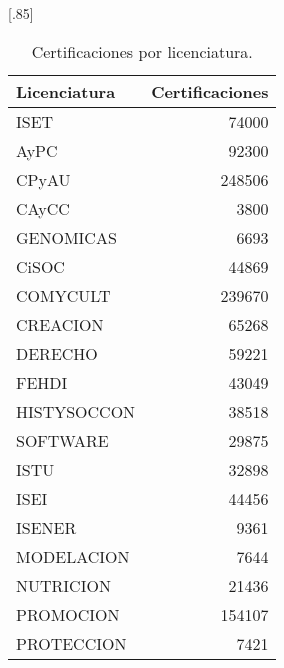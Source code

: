 \documentclass[12pt]{article}
\begin{document}
\begin{table}[ht]
\centering
\scalebox{0.75}[.85]{
\begin{tabular}{lr}
  \hline
 Licenciatura& Certificaciones \\ 
  \hline
ISET & 74000 \\ 
  AyPC & 92300 \\ 
  CPyAU & 248506 \\ 
  CAyCC & 3800 \\ 
  GENOMICAS & 6693 \\ 
  CiSOC & 44869 \\ 
  COMYCULT & 239670 \\ 
  CREACION & 65268 \\ 
  DERECHO & 59221 \\ 
  FEHDI & 43049 \\ 
  HISTYSOCCON & 38518 \\ 
  SOFTWARE & 29875 \\ 
  ISTU & 32898 \\ 
  ISEI & 44456 \\ 
  ISENER & 9361 \\ 
  MODELACION & 7644 \\ 
  NUTRICION & 21436 \\ 
  PROMOCION & 154107 \\ 
  PROTECCION & 7421 \\ 
   \hline
\end{tabular}
}
\caption{\label{Cert_Lic} Certificaciones por licenciatura.}
\end{table}
\end{document}
